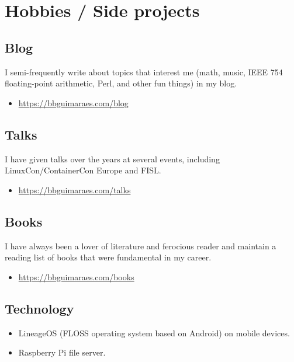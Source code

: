 \section*{Hobbies / Side projects}
\label{sec:etc}

\subsection*{Blog}

I semi-frequently write about topics that interest me (math, music, IEEE 754
floating-point arithmetic, Perl, and other fun things) in my blog.

\begin{itemize}
    \item \url{https://bbguimaraes.com/blog}
\end{itemize}

\subsection*{Talks}

I have given talks over the years at several events, including
LinuxCon/ContainerCon Europe and FISL.

\begin{itemize}
    \item \url{https://bbguimaraes.com/talks}
\end{itemize}

\subsection*{Books}

I have always been a lover of literature and ferocious reader and maintain a
reading list of books that were fundamental in my career.

\begin{itemize}
    \item \url{https://bbguimaraes.com/books}
\end{itemize}

\subsection*{Technology}

\begin{itemize}
    \item
        LineageOS (FLOSS operating system based on Android) on mobile devices.
    \item Raspberry Pi file server.
\end{itemize}

